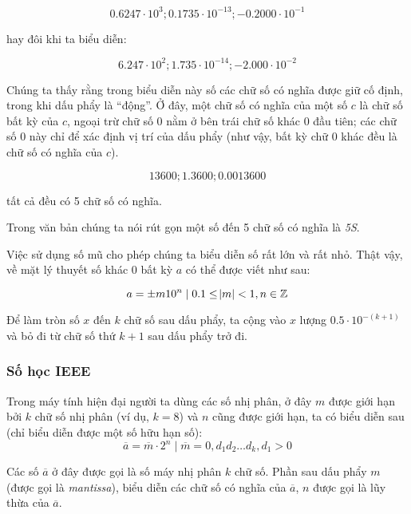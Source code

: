 \documentclass[../../Lectures.tex]{subfiles}
\begin{document}
\[\num{0.6247} \cdot 10^3; \num{0.1735} \cdot 10^{-13}; \num{-0.2000} \cdot 10^{-1}\]

hay đôi khi ta biểu diễn:

\[\num{6.247} \cdot 10^2; \num{1.735} \cdot 10^{-14}; \num{-2.000} \cdot 10^{-2}\]

Chúng ta thấy rằng trong biểu diễn này số các chữ số có nghĩa được giữ cố định,
trong khi dấu phẩy là ``động''. Ở đây, một chữ số có nghĩa của một số \(c\) là
chữ số bất kỳ của \(c\), ngoại trừ chữ số \(0\) nằm ở bên trái chữ số khác \(0\)
đầu tiên; các chữ số \(0\) này chỉ để xác định vị trí của dấu phẩy (như vậy, bất
kỳ chữ \(0\) khác đều là chữ số có nghĩa của \(c\)).

\begin{exmp}
    \[\num{13600}; \num{1.3600}; \num{0.0013600}\]

    tất cả đều có 5 chữ số có nghĩa.
\end{exmp}

Trong văn bản chúng ta nói rút gọn một số đến 5 chữ số có nghĩa là \emph{5S}.

Việc sử dụng số mũ cho phép chúng ta biểu diễn số rất lớn và rất nhỏ. Thật vậy,
về mặt lý thuyết số khác 0 bất kỳ \(a\) có thể được viết như sau:

\[a = \pm m 10^n \mid 0.1 \leq \abs{m} < 1, n \in \mathbb{Z}\]

\begin{rule_of_thumb}
    Để làm tròn số \(x\) đến \(k\) chữ số sau dấu phẩy, ta cộng vào \(x\) lượng
    \(\num{0.5} \cdot 10^{-(k+1)}\) và bỏ đi từ chữ số thứ \(k+1\) sau dấu phẩy
    trở đi.
\end{rule_of_thumb}

\subsubsection{Số học IEEE}

Trong máy tính hiện đại người ta dùng các số nhị phân, ở đây \(m\) được giới hạn
bởi \(k\) chữ số nhị phân (ví dụ, \(k = 8\)) và \(n\) cũng được giới hạn, ta có
biểu diễn sau (chỉ biểu diễn được một số hữu hạn số):
\begin{equation}
    \overline{a} = \overline{m} \cdot 2^n \mid \overline{m} = 0,d_1d_2\ldots d_k, d_1 > 0
\end{equation}

Các số \(\overline{a}\) ở đây được gọi là số máy nhị phân \(k\) chữ số. Phần sau
dấu phẩy \(m\) (được gọi là \emph{mantissa}), biểu diễn các chữ số có nghĩa của
\(\overline{a}\), \(n\) được gọi là lũy thừa của \(\overline{a}\).
\end{document}
